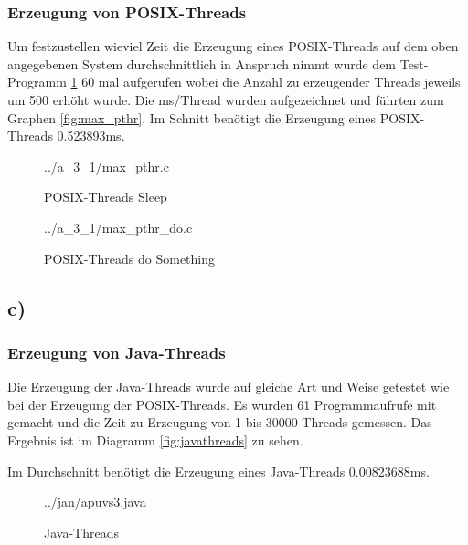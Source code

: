\documentclass[a4paper,
12pt,
BCOR12mm,
]{scrartcl}
\begin{document}
\subsubsection*{Erzeugung von POSIX-Threads}
Um festzustellen wieviel Zeit die Erzeugung eines POSIX-Threads auf dem oben angegebenen System durchschnittlich
in Anspruch nimmt wurde dem Test-Programm \ref{fig:max_pthr_listing} 60 mal aufgerufen wobei die Anzahl zu erzeugender Threads
jeweils um 500 erhöht wurde. Die ms/Thread wurden aufgezeichnet und führten zum Graphen \ref{fig:max_pthr}.
Im Schnitt benötigt die Erzeugung eines POSIX-Threads 0.523893ms.


\begin{figure}[h!]
	\begin{center}
		 {../a_3_1/max_pthr.c}
	\end{center}
	\caption{POSIX-Threads Sleep}
	\label{fig:max_pthr_listing}
\end{figure} 
\begin{figure}[h!]
	\begin{center}
		 {../a_3_1/max_pthr_do.c}
	\end{center}
	\caption{POSIX-Threads do Something}
	\label{fig:max_pthr_do_listing}
\end{figure} 





\subsection*{c)}
\subsubsection*{Erzeugung von Java-Threads}
Die Erzeugung der Java-Threads wurde auf gleiche Art und Weise getestet wie bei der Erzeugung der POSIX-Threads.
Es wurden 61 Programmaufrufe mit gemacht und die Zeit zu Erzeugung von 1 bis 30000 Threads gemessen.
Das Ergebnis ist im Diagramm \ref{fig:javathreads} zu sehen.

Im Durchschnitt benötigt die Erzeugung eines Java-Threads 0.00823688ms.

\begin{figure}[h!]
	\begin{center}
		 {../jan/apuvs3.java}
	\end{center}
	\caption{Java-Threads}
	\label{fig:java_listing}
\end{figure} 
\end{document}
